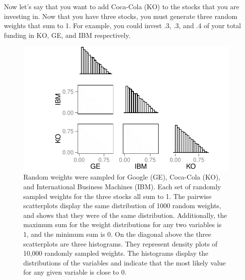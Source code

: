 \documentclass{article}\usepackage{graphicx, color}
\makeatletter
\def\maxwidth{ %
  \ifdim\Gin@nat@width>\linewidth
    \linewidth
  \else
    \Gin@nat@width
  \fi
}
\newenvironment{knitrout}{}{} %
\makeatother
\begin{document}
Now let's say that you want to add Coca-Cola (KO) to the stocks that you are investing in. Now that you have three stocks, you must generate three random weights that sum to 1. For example, you could invest .3, .3, and .4 of your total funding in KO, GE, and IBM respectively. 
  
\begin{figure}[H]
\begin{knitrout}
\color{fgcolor}
\includegraphics[width=\maxwidth]{figure/figChunk1} 

\end{knitrout}

\caption{Random weights were sampled for Google (GE), Coca-Cola (KO), and International Business Machines (IBM). Each set of randomly sampled weights for the three stocks all sum to 1. The pairwise scatterplots display the same distribution of 1000 random weights, and shows that they were of the same distribution. Additionally, the maximum sum for the weight distributions for any two variables is 1, and the minimum sum is 0. On the diagonal above the three scatterplots are three histograms. They represent density plots of 10,000 randomly sampled weights. The histograms display the distributions of the variables and indicate that the most likely value for any given variable is close to 0.}
\end{figure}
\end{document}
